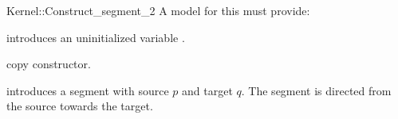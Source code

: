 \begin{ccRefFunctionObjectConcept}{Kernel::Construct_segment_2}
A model for this must provide:




\ccHidden {}
             {introduces an uninitialized variable .}

\ccHidden {}
            {copy constructor.}

            {introduces a segment  with source $p$
             and target $q$. The segment is directed from the source towards
             the target.}

\end{ccRefFunctionObjectConcept}
